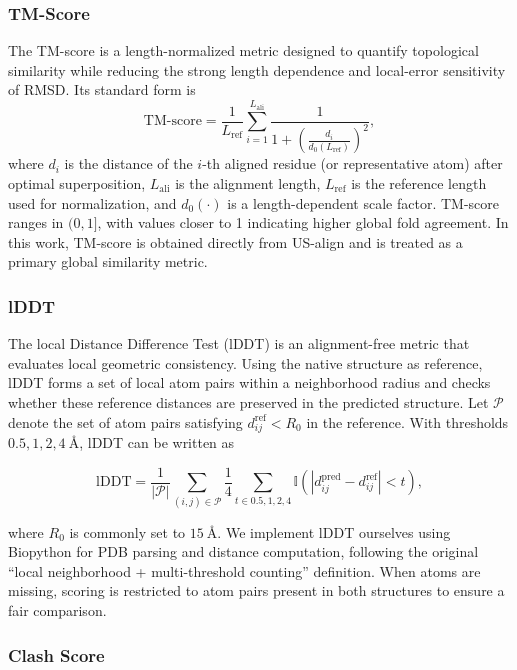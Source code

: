 \subsubsection{TM-Score}

The TM-score is a length-normalized metric designed to quantify topological similarity while reducing the strong length dependence and local-error sensitivity of RMSD. Its standard form is  
$$  
\mathrm{TM}\text{-}\mathrm{score}=\frac{1}{L_{\mathrm{ref}}}\sum_{i=1}^{L_{\mathrm{ali}}}\frac{1}{1+\left(\frac{d_i}{d_0(L_{\mathrm{ref}})}\right)^2},  
$$  
where $d_i$ is the distance of the $i$-th aligned residue (or representative atom) after optimal superposition, $L_{\mathrm{ali}}$ is the alignment length, $L_{\mathrm{ref}}$ is the reference length used for normalization, and $d_0(\cdot)$ is a length-dependent scale factor. TM-score ranges in $(0,1]$, with values closer to 1 indicating higher global fold agreement. In this work, TM-score is obtained directly from US-align and is treated as a primary global similarity metric.

\subsubsection{lDDT}

The local Distance Difference Test (lDDT) is an alignment-free metric that evaluates local geometric consistency\cite{mariani2013lddt}. Using the native structure as reference, lDDT forms a set of local atom pairs within a neighborhood radius and checks whether these reference distances are preserved in the predicted structure. Let $\mathcal{P}$ denote the set of atom pairs satisfying $d_{ij}^{\mathrm{ref}}<R_0$ in the reference. With thresholds ${0.5,1,2,4}\ \text{\AA}$, lDDT can be written as  

$$  
\mathrm{lDDT}=\frac{1}{|\mathcal{P}|}\sum_{(i,j)\in\mathcal{P}}\frac{1}{4}\sum_{t\in{0.5,1,2,4}}\mathbb{I}\left(\left|d_{ij}^{\mathrm{pred}}-d_{ij}^{\mathrm{ref}}\right|<t\right),  
$$  

where $R_0$ is commonly set to $15\ \text{\AA}$. We implement lDDT ourselves using Biopython for PDB parsing and distance computation, following the original “local neighborhood + multi-threshold counting” definition. When atoms are missing, scoring is restricted to atom pairs present in both structures to ensure a fair comparison.

\subsubsection{Clash Score}

